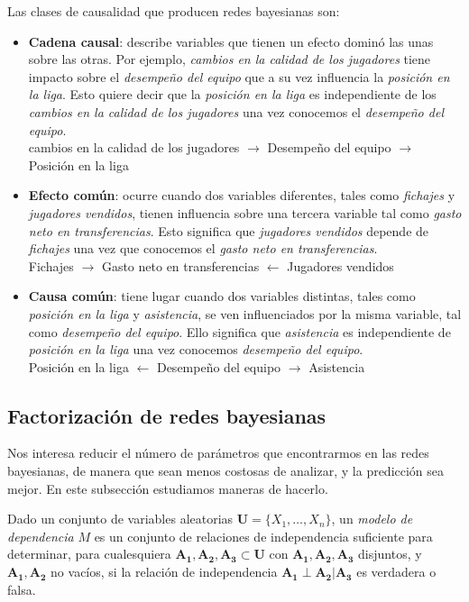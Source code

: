 Las clases de causalidad que producen redes bayesianas son:
\begin{itemize}
    \item \textbf{Cadena causal}: describe variables que tienen un efecto dominó las unas sobre las otras. Por ejemplo, \textit{cambios en la calidad de 
    los jugadores} tiene impacto sobre el \textit{desempeño del equipo} que a su vez influencia la \textit{posición en la liga}. 
    Esto quiere decir que la \textit{posición en la liga} es independiente de los \textit{cambios en la calidad de los jugadores} una vez conocemos el \textit{desempeño del equipo}.\\
    cambios en la calidad de los jugadores $\rightarrow$ Desempeño del equipo $\rightarrow$ Posición en la liga
    \item \textbf{Efecto común}: ocurre cuando dos variables diferentes, tales como \textit{fichajes} y \textit{jugadores vendidos}, tienen influencia sobre una tercera variable tal como 
    \textit{gasto neto en transferencias}. Esto significa que \textit{jugadores vendidos} depende de \textit{fichajes} una vez que conocemos el \textit{gasto neto en transferencias}.\\
    Fichajes $\rightarrow$ Gasto neto en transferencias $\leftarrow$ Jugadores vendidos    
    \item \textbf{Causa común}: tiene lugar cuando dos variables distintas, tales como \textit{posición en la liga} y \textit{asistencia}, se ven influenciados por la misma variable, tal 
    como \textit{desempeño del equipo}. Ello significa que \textit{asistencia} es independiente de \textit{posición en la liga} una vez conocemos \textit{desempeño del equipo}.\\
    Posición en la liga $\leftarrow$ Desempeño del equipo $\rightarrow$ Asistencia
\end{itemize}

\subsection{Factorización de redes bayesianas}
Nos interesa reducir el número de parámetros que encontrarmos en las redes bayesianas, de manera que sean menos 
costosas de analizar, y la predicción sea mejor. En este subsección estudiamos maneras de hacerlo.

Dado un conjunto de variables aleatorias $\mathbf{U} = \{X_1, \dots, X_n\}$, un {\em modelo de dependencia} $M$ 
es un conjunto de relaciones de independencia suficiente para determinar, para cualesquiera $\mathbf{A_1}, 
\mathbf{A_2}, \mathbf{A_3} \subset \mathbf{U}$ con $\mathbf{A_1}, \mathbf{A_2}, \mathbf{A_3}$
disjuntos, y $\mathbf{A_1}, \mathbf{A_2}$ no vacíos, si la relación de independencia $\mathbf{A_1} \perp 
\mathbf{A_2} | \mathbf{A_3}$ es verdadera o falsa. 

